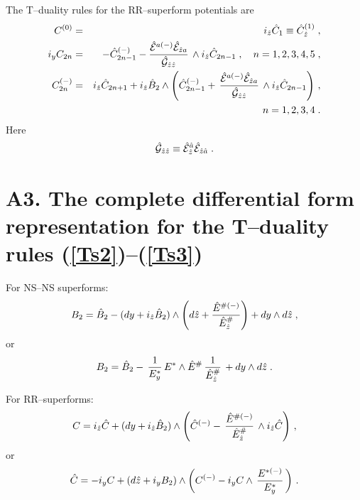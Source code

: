\documentclass[a4paper,11pt]{article}
\begin{document}
The T--duality rules for the RR--superform potentials are 
\begin{eqnarray}
\label{TCr0} 
C^{(0)} &=&  i_{\hat{z}}\hat{C}_1 \equiv \hat{C}^{(1)}_{\hat{z}}\; , 
\\ \label{TCr2}
i_{y}C_{2n}  &=& - \hat{C}^{(-)}_{2n-1} -  
{\hat{{\cal E}}^{a(-)}\hat{{\cal E}}_{\hat{z}a}
\over \hat{{\cal G}}_{\hat{z}\hat{z}}}
\,\wedge 
i_{\hat{z}} \hat{C}_{2n-1} \; , \quad n=1,2,3,4,5\; ,
\\ \label{TCr3}
C^{(-)}_{2n} 
&=& i_{\hat{z}}\hat{C}_{2n+1} + 
i_{\hat{z}} \hat{B}_2 \wedge 
\left(\hat{C}^{(-)}_{2n-1} + \, {\hat{{\cal E}}^{a(-)}\hat{{\cal E}}_{\hat{z}a}
\over \hat{{\cal G}}_{\hat{z}\hat{z}}} \,
\wedge 
i_{\hat{z}} \hat{C}_{2n-1} \right)\, ,  \\ 
&& \nonumber \quad n=1,2,3,4\; .
\end{eqnarray} 
Here
\begin{eqnarray}\label{calG-r}
\hat{{\cal G}}_{\hat{z}\hat{z}}\equiv \hat{{\cal E}}_{\hat{z}}^{\hat{a}}
\hat{{\cal E}}_{\hat{z}\hat{a}}\; .
\end{eqnarray}


\newpage 

\section*{A3. The complete 
differential form representation for the T--duality rules 
(\ref{Ts2})--(\ref{Ts3})} 

For NS--NS superforms: 
\begin{equation}\label{TBsg-r1}
{{B}}_2=  \hat{{B}}_2 -
(dy + i_{\hat{z}} \hat{B}_2) \wedge
\left(d\hat{z}+ {\hat{E}^{ {\#}(-)}
\over \hat{E}_{\hat{z}}^{ {\#}}}\right) + dy \wedge d\hat{z}\; ,    
\end{equation} 
or  
\begin{equation}
\label{rTdB2-r2} 
B_2 = \hat{B}_2 - \, 
{1\over {E}_y^{ {*}}} \, 
E^{ {*}} \wedge \hat{E}^{ {\# }} \,
{1\over \hat{E}_{\hat{z}}^{ {\#}}}\, 
+ dy  \wedge d\hat{z} \; .
\end{equation}

For RR--superforms: 
\begin{equation}
\label{rC=-r1} 
C= i_{\hat{z}}\hat{C} + (dy +i_{\hat{z}} \hat{B}_2) \wedge 
\left(\hat{C}^{(-)} -  \,
{\hat{E}^{ {\#}(-)}\over \hat{E}_{\hat{z}}^{ {\#}}}\, 
\wedge 
i_{\hat{z}} \hat{C} \right)\, ,
\end{equation}
or 
\begin{equation}\label{rhC=r1}
\hat{C} = - i_y C + (d\hat{z}+ i_yB_2)\wedge 
\left(C^{(-)}- i_y C \wedge \,
 {{E}^{ {*}(-)}\over {E}_y^{ {*}}}\, \right)
\, .  
\end{equation}
\end{document}
